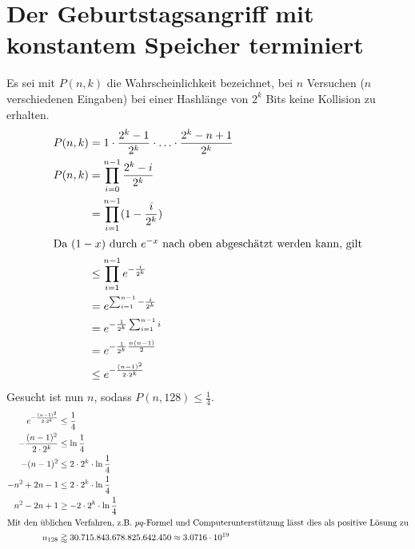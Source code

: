 \documentclass{../crypto}
\date{4. Dezember 2015}
\begin{document}
\maketitle

\section{Der Geburtstagsangriff mit konstantem Speicher terminiert}
Es sei mit $P(n,k)$ die Wahrscheinlichkeit bezeichnet, bei $n$ Versuchen ($n$ verschiedenen Eingaben) bei einer Hashlänge von $2^k$ Bits keine Kollision zu erhalten.
\begin{align*}
   P(n,k)  & = 1 \cdot \frac{2^k - 1}{2^k} \cdot \ldots \cdot \frac{2^k - n + 1}{2^k} \\
   P(n,k)  & =   \prod_{i=0}^{n-1} \frac{2^k - i}{2^k}                                \\
           & =   \prod_{i=1}^{n-1} (1 -  \frac{i}{2^k})                               \\
\intertext{Da $(1-x)$ durch $e^{-x}$ nach oben abgeschätzt werden kann, gilt}
           & \le \prod_{i=1}^{n-1} e^{-\frac{i}{2^k}} \\
           & =   e^{\sum_{i=1}^{n-1}-\frac{i}{2^k}}   \\
           & =   e^{-\frac{1}{2^k}\sum_{i=1}^{n-1}i}  \\
           & =   e^{-\frac{1}{2^k} \frac{n(n-1)}{2}}  \\
           & \le   e^{-\frac{(n-1)^2}{2\cdot 2^k}}    \\
\end{align*}
Gesucht ist nun $n$, sodass $P(n,128) \le \frac{1}{4}$.
\begin{align*}
   e^{-\frac{(n-1)^2}{2\cdot 2^k}} & \le \frac{1}{4}                        \\
   -\frac{(n-1)^2}{2\cdot 2^k}     & \le \ln{\frac{1}{4}}                   \\
   -(n-1)^2                        & \le 2\cdot 2^k \cdot \ln{\frac{1}{4}}  \\
   -n^2 + 2n - 1                   & \le 2\cdot 2^k \cdot \ln{\frac{1}{4}}  \\
   n^2 - 2n + 1                    & \ge -2\cdot 2^k \cdot \ln{\frac{1}{4}} \\
   \intertext{Mit den üblichen Verfahren, z.B. $pq$-Formel und
   Computerunterstützung lässt dies als positive Lösung zu}
   n_{128}                         & \gtrapprox 30.715.843.678.825.642.450 \approx 3.0716 \cdot 10^{19}
\end{align*}
\end{document}
